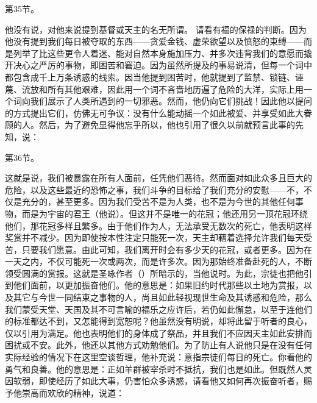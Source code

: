 第35节。 \par

他没有说，对他来说提到基督或天主的名无所谓。 请看有福的保禄的判断。因为他没有提到我们每日被夺取的东西——贪爱金钱、虚荣欲望以及愤怒的束缚——而是列举了比这些更令人着迷、能对自然本身施加压力、并多次违背我们的意愿而撬开决心之严厉的事物，即困苦和窘迫。因为虽然所提及的事易说清，但每一个词中都包含成千上万条诱惑的线索。因当他提到困苦时，他就提到了监禁、锁链、诬蔑、流放和所有其他艰难，因此用一个词不吝啬地历遍了危险的大洋，实际上用一个词向我们展示了人类所遇到的一切邪恶。然而，他仍向它们挑战！因此他以提问的方式提出它们，仿佛无可争议：没有什么能动摇一个如此被爱、并享受如此大眷顾的人。然后，为了避免显得他忘乎所以，他也引用了很久以前就预言此事的先知，说：\par

第36节。 \par

这就是说，我们被暴露在所有人面前，任凭他们恶待。然而面对如此众多且巨大的危险，以及这些最近的恐怖之事，我们斗争的目标给了我们充分的安慰——不，不仅是充分的，甚至更多。因为我们受苦不是为人类，也不是为今世的其他任何事物，而是为宇宙的君王（他说）。但这并不是唯一的花冠；他还用另一顶花冠环绕他们，那花冠多样且繁多。由于他们作为人，无法承受无数次的死亡，他表明这样奖赏并不减少。因为即使按本性注定只能死一次，天主却藉着选择允许我们每天受苦，只要我们愿意。由此可知，我们离开时会有多少天的花冠，或者更多。因为在一天之内，不仅可能死一次或两次，而是许多次。因为那始终准备赴死的人，不断领受圆满的赏报。这就是圣咏作者（）所暗示的，当他说时。为此，宗徒也把他引到他们面前，以更加振奋他们。他的意思是：如果旧约时代那些以土地为赏报，以及其它与今世一同结束之事物的人，尚且如此轻视现世生命及其诱惑和危险，那么我们蒙受天堂、天国及其不可言喻的福乐之应许后，若仍如此懈怠，以至于连他们的标准都达不到，又怎能得到宽恕呢？他虽然没有明说，却将此留于听者的良心，仅以引用为满足。他也表明他们的身体成了祭品，并且我们不应因天主如此安排而困扰或不安。此外，他还以其他方式劝勉他们。为了防止有人说他只是在没有任何实际经验的情况下在这里空谈哲理，他补充说：意指宗徒们每日的死亡。你看他的勇气和良善。他的意思是：正如羊群被宰杀时不抵抗，我们也是如此。但既然人灵因软弱，即使经历了如此大事，仍害怕众多诱惑，请看他又如何再次振奋听者，赐予他崇高而欢欣的精神，说道：\par

